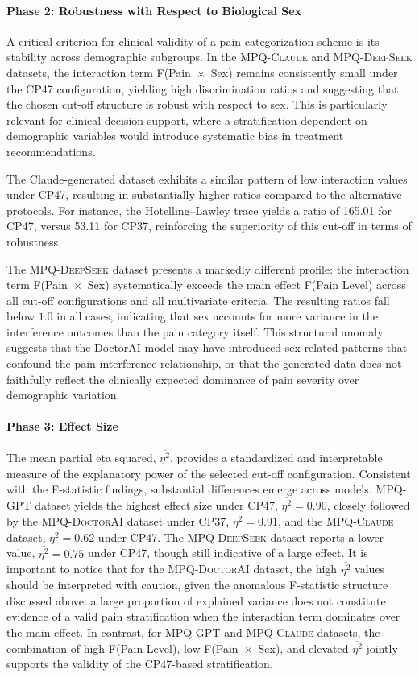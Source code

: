 \documentclass[preprint,12pt,authoryear]{elsarticle}
\newcommand{\dbGPT}{\small\textsc{MPQ-GPT}\xspace}
\newcommand{\dbClaude}{\small\textsc{MPQ-Claude}\xspace}
\newcommand{\dbDeepSeek}{\small\textsc{MPQ-DeepSeek}\xspace}
\newcommand{\dbDoctorAI}{\small\textsc{MPQ-DoctorAI}\xspace}
\begin{document}
\paragraph{Phase 2: Robustness with Respect to Biological Sex}

A critical criterion for clinical validity of a pain categorization scheme is its stability across demographic subgroups. In the \dbClaude and \dbDeepSeek datasets, the interaction term F(Pain~$\times$~Sex) remains consistently small under the CP47 configuration, yielding high discrimination ratios and suggesting that the chosen cut-off structure is robust with respect to sex. This is particularly relevant for clinical decision support, where a stratification dependent on demographic variables would introduce systematic bias in treatment recommendations.

The Claude-generated dataset exhibits a similar pattern of low interaction values under CP47, resulting in substantially higher ratios compared to the alternative protocols. For instance, the Hotelling--Lawley trace yields a ratio of 165.01 for CP47, versus 53.11 for CP37, reinforcing the superiority of this cut-off in terms of robustness.

The \dbDeepSeek dataset presents a markedly different profile: the interaction term F(Pain~$\times$~Sex) systematically exceeds the main effect F(Pain Level) across all cut-off configurations and all multivariate criteria. The resulting ratios fall below $1.0$ in all cases, indicating that sex accounts for more variance in the interference outcomes than the pain category itself. This structural anomaly suggests that the DoctorAI model may have introduced sex-related patterns that confound the pain-interference relationship, or that the generated data does not faithfully reflect the clinically expected dominance of pain severity over demographic variation.

\paragraph{Phase 3: Effect Size}
The mean partial eta squared, $\overline{\eta^2}$, provides a standardized and interpretable measure of the explanatory power of the selected cut-off configuration. Consistent with the F-statistic findings, substantial differences emerge across models. \dbGPT dataset yields the highest effect size under CP47, $\overline{\eta^2} = 0.90$, closely followed by the \dbDoctorAI dataset under CP37, $\overline{\eta^2} = 0.91$, and the \dbClaude dataset, $\overline{\eta^2} = 0.62$ under CP47. The \dbDeepSeek dataset reports a lower value, $\overline{\eta^2} = 0.75$ under CP47, though still indicative of a large effect. It is important to notice that for the \dbDoctorAI dataset, the high $\overline{\eta^2}$ values should be interpreted with caution, given the anomalous F-statistic structure discussed above: a large proportion of explained variance does not constitute evidence of a valid pain stratification when the interaction term dominates over the main effect. In contrast, for \dbGPT and \dbClaude datasets, the combination of high F(Pain Level), low F(Pain~$\times$~Sex), and elevated $\overline{\eta^2}$ jointly supports the validity of the CP47-based stratification.
\end{document}
